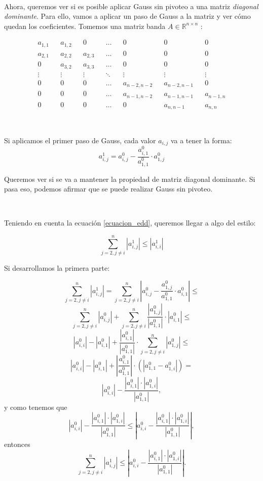 \

Ahora, queremos ver si es posible aplicar Gauss sin pivoteo a una matriz \emph{diagonal dominante}. Para ello, vamos a aplicar un paso de Gauss a la matriz y ver cómo quedan los coeficientes. Tomemos una matriz banda $A \in \mathbb{R}^{n \times n}$ :

\begin{align*}
    &a_{1,1}& &a_{1,2}& &0& &\ldots& &0& &0& &0& \\
    &a_{2,1}& &a_{2,2}& &a_{2,3}& &\ldots& &0& &0& &0& \\
    &0& &a_{3,2}& &a_{3,3}& &\ldots& &0& &0& &0& \\
    &\vdots& &\vdots& &\vdots& &\ddots& &\vdots& &\vdots& &\vdots& \\
    &0& &0& &0& &\ldots& &a_{n-2,n-2}& &a_{n-2,n-1}& &0& \\
    &0& &0& &0& &\ldots& &a_{n-1,n-2}& &a_{n-1,n-1}& &a_{n-1,n}& \\
    &0& &0& &0& &\ldots& &0& &a_{n,n-1}& &a_{n,n}& 
\end{align*}

\

Si aplicamos el primer paso de Gauss, cada valor $a_{i,j}$ va a tener la forma:
\[
    a_{i,j}^{1} = a_{i,j}^{0} - \frac{a_{i,1}^{0}}{a_{1,1}^{0}}\cdot a_{1,j}^{0}
\]
    
Queremos ver si se va a mantener la propiedad de matriz diagonal dominante. Si pasa eso, podemos afirmar que se puede realizar Gauss sin pivoteo. 

\

Teniendo en cuenta la ecuación \ref{ecuacion_edd}, queremos llegar a algo del estilo:

\[
    \sum_{j=2, j \neq i}^{n} |a_{i,j}^{1}| \leq |a_{i,i}^{1}| 
\]

Si desarrollamos la primera parte:

\[
 \sum_{j=2, j \neq i}^{n} |a_{i,j}^{1}| = \sum_{j=2, j \neq i}^{n} |a_{i,j}^{0} - \frac{a_{1,j}^{0}}{a_{1,1}^{0}}\cdot a_{i,1}^{0}| \leq 
\]
\[
\sum_{j=2, j \neq i}^{n} |a_{i,j}^{0}| +  \sum_{j=2, j \neq i}^{n} \frac{|a_{1,j}^{0}|}{|a_{1,1}^{0}|}\cdot |a_{i,1}^{0}| \leq
\]
\[
|a_{i,i}^{0}| - |a_{i,1}^{0}| + \frac{|a_{i,1}^{0}|}{|a_{1,1}^{0}|} \cdot  \sum_{j=2, j \neq i}^{n} |a_{1,j}^{0}| \leq
\]
\[
|a_{i,i}^{0}| - |a_{i,1}^{0}| + |\frac{a_{i,1}^{0}}{a_{1,1}^{0}}| \cdot  (|a_{1,1}^{0} - a_{1,i}^{0}|) =
\]
\[
|a_{i,i}^{0}| - \frac{|a_{i,1}^{0}|\cdot|a_{1,i}^{0}|}{|a_{1,1}^{0}|}, 
\]
y como tenemos que 
\[
|a_{i,i}^{0}| - \frac{|a_{i,1}^{0}|\cdot|a_{1,i}^{0}|}{|a_{1,1}^{0}|} \leq |a_{i,i}^{0} - \frac{|a_{i,1}^{0}|\cdot|a_{1,i}^{0}|}{|a_{1,1}^{0}|} | ,
\]
entonces
\[
   \sum_{j=2, j \neq i}^{n} |a_{i,j}^{1}| \leq |a_{i,i}^{0} - \frac{|a_{i,1}^{0}|\cdot|a_{1,i}^{0}|}{|a_{1,1}^{0}|} |. 
\]
    
